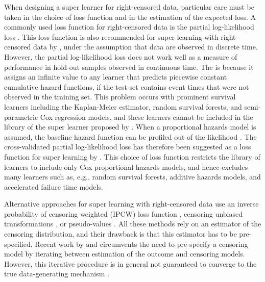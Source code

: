\documentclass[lineno]{biometrika}
\newcommand{\1}{\mathds{1}}
\begin{document}
When designing a super learner for right-censored data, particular
care must be taken in the choice of loss function and in the
estimation of the expected loss. A commonly used loss function for
right-censored data is the partial log-likelihood loss
\citep[e.g.,][]{li2016regularized,yao2017deep,lee2018deephit,katzman2018deepsurv,gensheimer2019scalable,lee2021boosted,kvamme2021continuous}.
This loss function is also recommended for super learning with
right-censored data by \cite{polley2011-sl-cens}, under the assumption
that data are observed in discrete time. However, the partial
log-likelihood loss does not work well as a measure of performance in
hold-out samples observed in continuous time. The is because it
assigns an infinite value to any learner that predicts piecewise
constant cumulative hazard functions, if the test set contains event
times that were not observed in the training set. This problem occurs
with prominent survival learners including the Kaplan-Meier estimator,
random survival forests, and semi-parametric Cox regression models,
and these learners cannot be included in the library of the super
learner proposed by \cite{polley2011-sl-cens}. When a proportional
hazards model is assumed, the baseline hazard function can be profiled
out of the likelihood \citep{cox1972regression}. The cross-validated
partial log-likelihood loss \citep{verweij1993cross} has therefore
been suggested as a loss function for super learning by
\cite{golmakani2020super}. This choice of loss function restricts the
library of learners to include only Cox proportional hazards models,
and hence excludes many learners such as, e.g., random survival
forests, additive hazards models, and accelerated failure time models.

Alternative approaches for super learning with right-censored data use
an inverse probability of censoring weighted (IPCW) loss function
\citep{graf1999assessment,van2003unicv,molinaro2004tree,keles2004asymptotically,hothorn2006survival,gerds2006consistent,gonzalez2021stacked},
censoring unbiased transformations
\citep{fan1996local,steingrimsson2019censoring}, or pseudo-values
\citep{andersen2003generalised,mogensen2013random,sachs2019ensemble}.
All these methods rely on an estimator of the censoring distribution,
and their drawback is that this estimator has to be pre-specified.
Recent work by
\cite{han2021inverse} and \cite{westling2021inference} 
circumvents the need to pre-specify a censoring model by iterating
between estimation of the outcome and censoring models. However, this
iterative procedure is in general not guaranteed to converge to the
true data-generating mechanism
\citep[][Appendix~A.4]{munch2024thesis}.
\end{document}
